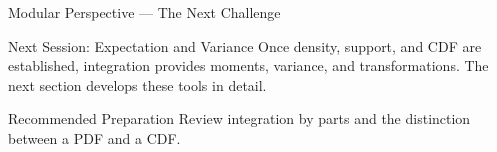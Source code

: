 \documentclass[aspectratio=169,xcolor={dvipsnames,table}]{beamer}
\begin{document}
\begin{frame}{Modular Perspective --- The Next Challenge}
\scriptsize
\begin{alertblock}{Next Session: Expectation and Variance}
Once density, support, and CDF are established, integration provides moments,
variance, and transformations. The next section develops these tools in detail.
\end{alertblock}
\begin{block}{Recommended Preparation}
Review integration by parts and the distinction between a PDF and a CDF.
\end{block}
\end{frame}
\end{document}
